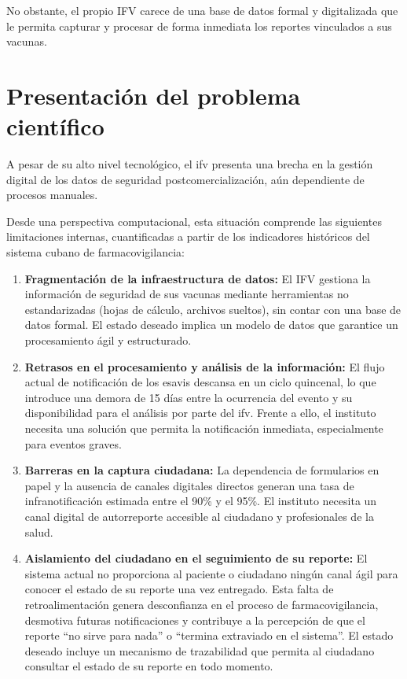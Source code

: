 No obstante, el propio IFV carece de una base de datos formal y digitalizada que le permita capturar y procesar de forma inmediata los reportes vinculados a sus vacunas.




\section{Presentación del problema científico}\label{section:presentacionProblema}

A pesar de su alto nivel tecnológico, el \gls{ifv} presenta una brecha en la gestión digital de los datos de seguridad postcomercialización, aún dependiente de procesos manuales. 

Desde una perspectiva computacional, esta situación comprende las siguientes limitaciones internas, cuantificadas a partir de los indicadores históricos del sistema cubano de farmacovigilancia:

\begin{enumerate}[label=L\arabic*]
\item \textbf{Fragmentación de la infraestructura de datos:} El IFV gestiona la información de seguridad de sus vacunas mediante herramientas no estandarizadas (hojas de cálculo, archivos sueltos), sin contar con una base de datos formal. El estado deseado implica un modelo de datos que garantice un procesamiento ágil y estructurado.

\item \textbf{Retrasos en el procesamiento y análisis de la información:} El flujo actual de notificación de los \glspl{esavi} descansa en un ciclo quincenal, lo que introduce una demora de 15 días entre la ocurrencia del evento y su disponibilidad para el análisis por parte del \gls{ifv}. 
Frente a ello, el instituto necesita una solución que permita la notificación inmediata, especialmente para eventos graves.

\item \textbf{Barreras en la captura ciudadana:} La dependencia de formularios en papel y la ausencia de canales digitales directos generan una tasa de infranotificación estimada entre el 90\% y el 95\%. 
El instituto necesita un canal digital de autorreporte accesible al ciudadano y profesionales de la salud.

\item \textbf{Aislamiento del ciudadano en el seguimiento de su reporte:} El sistema actual no proporciona al paciente o ciudadano ningún canal ágil para conocer el estado de su reporte una vez entregado. 
Esta falta de retroalimentación genera desconfianza en el proceso de farmacovigilancia, desmotiva futuras notificaciones y contribuye a la percepción de que el reporte ``no sirve para nada'' o ``termina extraviado en el sistema''. 
El estado deseado incluye un mecanismo de trazabilidad que permita al ciudadano consultar el estado de su reporte en todo momento.
 
\end{enumerate}


